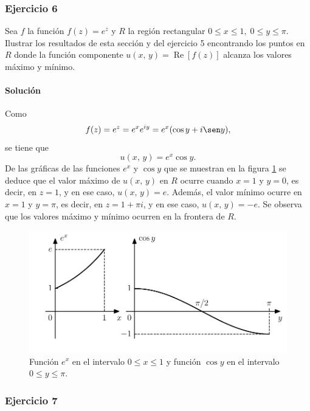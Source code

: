 \documentclass[a4paper]{report}
\renewcommand{\Re}{\operatorname{Re}}
\begin{document}
\subsubsection{Ejercicio 6}

Sea \(f\) la función \(f(z)=e^z\) y \(R\) la región rectangular \(0\leq x\leq 1,\;0\leq y\leq\pi\). Ilustrar los resultados de esta sección y del ejercicio 5 encontrando los puntos en \(R\) donde la función componente \(u(x,\,y)=\Re[f(z)]\) alcanza los valores máximo y mínimo.

\paragraph{Solución} Como
\[
 f(z)=e^z=e^xe^{iy}=e^x(\cos y+i\sen y),
\]
se tiene que 
\[
 u(x,\,y)=e^x\cos y.
\]
De las gráficas de las funciones \(e^x\) y \(\cos y\) que se muestran en la figura \ref{fig:exercise_59_06_graphs} se deduce que el valor máximo de \(u(x,\,y)\) en \(R\) ocurre cuando \(x=1\) y \(y=0\), es decir, en \(z=1\), y en ese caso, \(u(x,\,y)=e\). Además, el valor mínimo ocurre en \(x=1\) y \(y=\pi\), es decir, en \(z=1+\pi i\), y en ese caso, \(u(x,\,y)=-e\). Se observa que los valores máximo y mínimo ocurren en la frontera de \(R\).
\begin{figure}[!htb]
  \begin{minipage}[c]{0.7\textwidth}
    \includegraphics[width=\textwidth]{figuras/exercise_59_06_graphs.pdf}
  \end{minipage}\hfill
  \begin{minipage}[c]{0.2\textwidth}
    \caption{
       Función \(e^x\) en el intervalo  \(0\leq x\leq1\) y función \(\cos y\) en el intervalo \(0\leq y\leq\pi\).
    }\label{fig:exercise_59_06_graphs}
  \end{minipage}
\end{figure}

\subsubsection{Ejercicio 7}
\end{document}
